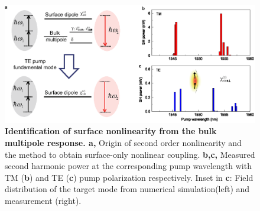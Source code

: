 \documentclass[a4paper,8pt,hyperref, twocolumn]{article}
\begin{document}



\begin{figure}[!ht]
\includegraphics[width=18cm]{Fig3new.eps}
\caption{\textbf{Identification of surface nonlinearity from the bulk multipole response. a, }Origin of second order nonlinearity and the method to obtain surface-only nonlinear coupling. \textbf{b,c,} Measured second harmonic power at the corresponding pump wavelength with TM (\textbf{b}) and TE (\textbf{c}) pump polarization respectively. Inset in \textbf{c}: Field distribution of the target mode from numerical simulation(left) and measurement (right).}
\label{pic:Fig3}
\end{figure}
\end{document}
